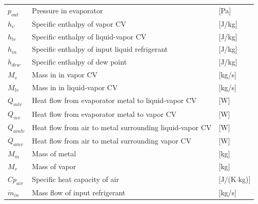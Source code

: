 \begin{center}
	\begin{tabular}{l p{10cm} l}
		$ p_{out} $      & Pressure in evaporator                                                   & [\si{Pa}]                         \\
		$h_{v} $         & Specific enthalpy of vapor CV                                            & [\si{J}/\si{kg}]                  \\
		$h_{lv} $        & Specific enthalpy of liquid-vapor CV                                     & [\si{J}/\si{kg}]                  \\
		$h_{in} $        & Specific enthalpy of input liquid refrigerant                            & [\si{J}/\si{kg}]                  \\
		$h_{dew}$        & Specific enthalpy of dew point                                           & [\si{J}/\si{kg}]                  \\
		$M_{v}$          & Mass in	in vapor CV                                                      & [\si{kg}/\si{s}]                  \\
		$M_{lv}$         & Mass in	in liquid-vapor CV                                               & [\si{kg}/\si{s}]                  \\
		$Q_{mlv}$        & Heat flow from evaporator metal to liquid-vapor CV                       & [\si{W}]                          \\
		$Q_{mv}$         & Heat flow from evaporator metal to vapor CV                              & [\si{W}]                          \\
		$Q_{amlv}$       & Heat flow from air to metal surrounding liquid-vapor CV                  & [\si{W}]                          \\
		$Q_{amv}$        & Heat flow from air to metal surrounding vapor CV                         & [\si{W}]                          \\
		$M_{m}$          & Mass of metal                                                            & [\si{kg}]                         \\
		$M_{v}$          & Mass of vapor                                                            & [\si{kg}]                         \\
		$Cp_{air}$       & Specific heat capacity of air                                            & [\si{J}/(\si{K}$ \cdot $\si{kg})] \\
		$\dot{m}_{in} $  & Mass flow of input refrigerant                                           & [\si{kg}/\si{s}]                  \\

\end{tabular}
\end{center}
